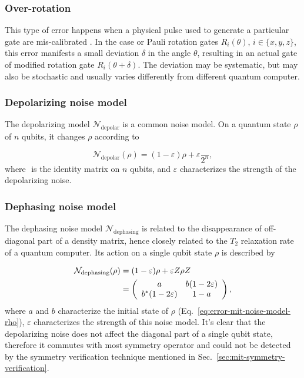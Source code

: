 \subsubsection{Over-rotation}

This type of error happens when a physical pulse used to generate a particular gate are mis-calibrated
\cite{merrillProgressCompensatingPulse2012}. In the case or Pauli rotation gates $R_{i}(\theta)$, $i\in\{x,y,z\}$,
this error manifests a small deviation $\delta$ in the angle $\theta$, resulting in an actual gate of modified
rotation gate $R_i(\theta + \delta)$. The deviation may be systematic\cite{bultriniSimpleMitigationStrategy2020}, but may also be stochastic and usually varies differently from different quantum computer.


\subsubsection{Depolarizing noise model}

The depolarizing model $\mathcal{N}_{\text{depolar}}$ is a common noise model. On a quantum state $\rho$ of $n$ qubits, it changes $\rho$ according to

\begin{equation}
    \mathcal{N}_{\text{depolar}}( \rho ) =( 1-\varepsilon ) \rho +\varepsilon \frac{\unit{}}{2^{n}},
\end{equation}
where $\unit{}$ is the identity matrix on $n$ qubits, and $\varepsilon$ characterizes the strength of the depolarizing noise.

\subsubsection{Dephasing noise model}

The dephasing noise model $\mathcal{N}_{\mathrm{dephasing}}$ is related to the disappearance of off-diagonal part of a density matrix, hence closely related to the $T_2$ relaxation rate of a quantum computer. Its action on a single qubit state $\rho$ is described by

\begin{equation}
    \begin{aligned}
        \mathcal{N}_{\mathrm{dephasing}}(\rho ) & =( 1-\varepsilon ) \rho +\varepsilon Z\rho Z \\
                                                & =\left(\begin{array}{ c c }
                a                       & b( 1-2\varepsilon ) \\
                b^{*}( 1-2\varepsilon ) & 1-a
            \end{array}\right),
    \end{aligned}
\end{equation}
where $a$ and $b$ characterize the initial state of $\rho$ (Eq.~\ref{eq:error-mit-noise-model-rho}), $\varepsilon$ characterizes the strength of this noise model. It's clear that the depolarizing noise does not affect the diagonal part of a single qubit state, therefore it commutes with most symmetry operator and could not be detected by the symmetry verification technique mentioned in Sec.~\ref{sec:mit-symmetry-verification}.

